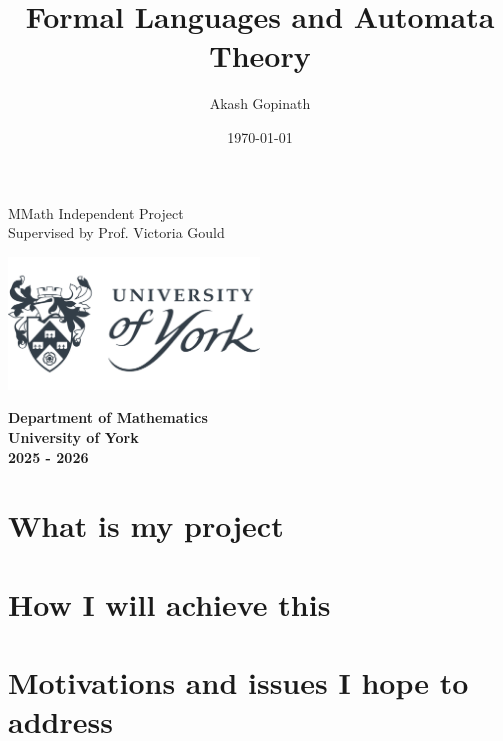 \documentclass[11pt]{report}
\title{\Huge\textbf{Formal Languages and Automata Theory}}
\author{\large Akash Gopinath}
\date{\today}
\begin{document}
{
\let\newpage\relax
\maketitle
\begin{center}
	\vfill
	\Large
	MMath Independent Project \\
	Supervised by Prof. Victoria Gould

	\vspace{0.4cm}
	\includegraphics[width=0.5\textwidth]{university.png}

	\textbf{
		Department of Mathematics \\
		University of York \\
		2025 - 2026	}
\end{center}
}
\titlepage

\pagestyle{fancy}


\tableofcontents
\newpage


%

\chapter{What is my project}

\newpage



\chapter{How I will achieve this}

\newpage

\chapter{Motivations and issues I hope to address}

\newpage
\end{document}
